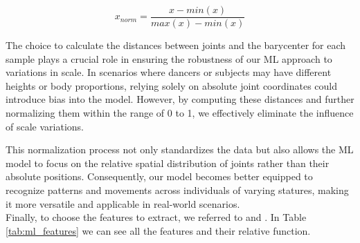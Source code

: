\begin{equation}
    x_{norm} = \frac{{x - min(x)}}{{max(x) - min(x)}}
    \label{formula:normalization}
\end{equation}
    
The choice to calculate the distances between joints and the barycenter for each sample plays a crucial role in ensuring the robustness of our ML approach to variations in scale.
In scenarios where dancers or subjects may have different heights or body proportions, relying solely on absolute joint coordinates could introduce bias into the model.
However, by computing these distances and further normalizing them within the range of 0 to 1, we effectively eliminate the influence of scale variations.

This normalization process not only standardizes the data but also allows the ML model to focus on the relative spatial distribution of joints rather than their absolute positions.
Consequently, our model becomes better equipped to recognize patterns and movements across individuals of varying statures, making it more versatile and applicable in real-world scenarios. \\

Finally, to choose the features to extract, we referred to \cite{oneto:2020} and \cite{sama:2010}.
In Table \ref{tab:ml_features} we can see all the features and their relative function.

